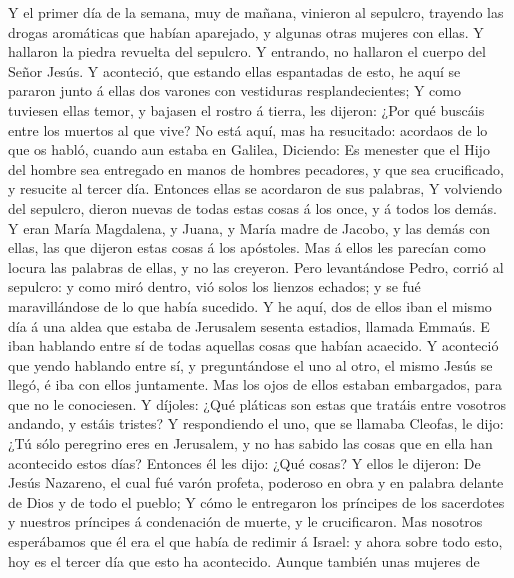  Y el primer día de la semana, muy de mañana, vinieron al
sepulcro, trayendo las drogas aromáticas que habían aparejado, y algunas
otras mujeres con ellas.  Y hallaron la piedra revuelta
del sepulcro.  Y entrando, no hallaron el cuerpo del Señor
Jesús.  Y aconteció, que estando ellas espantadas de esto,
he aquí se pararon junto á ellas dos varones con vestiduras
resplandecientes;  Y como tuviesen ellas temor, y bajasen
el rostro á tierra, les dijeron: ¿Por qué buscáis entre los muertos al
que vive?  No está aquí, mas ha resucitado: acordaos de lo
que os habló, cuando aun estaba en Galilea,  Diciendo: Es
menester que el Hijo del hombre sea entregado en manos de hombres
pecadores, y que sea crucificado, y resucite al tercer día.
 Entonces ellas se acordaron de sus palabras,
 Y volviendo del sepulcro, dieron nuevas de todas estas
cosas á los once, y á todos los demás.  Y eran María
Magdalena, y Juana, y María madre de Jacobo, y las demás con ellas, las
que dijeron estas cosas á los apóstoles.  Mas á ellos les
parecían como locura las palabras de ellas, y no las creyeron.
 Pero levantándose Pedro, corrió al sepulcro: y como miró
dentro, vió solos los lienzos echados; y se fué maravillándose de lo que
había sucedido.  Y he aquí, dos de ellos iban el mismo
día á una aldea que estaba de Jerusalem sesenta estadios, llamada
Emmaús.  E iban hablando entre sí de todas aquellas cosas
que habían acaecido.  Y aconteció que yendo hablando
entre sí, y preguntándose el uno al otro, el mismo Jesús se llegó, é iba
con ellos juntamente.  Mas los ojos de ellos estaban
embargados, para que no le conociesen.  Y díjoles: ¿Qué
pláticas son estas que tratáis entre vosotros andando, y estáis tristes?
 Y respondiendo el uno, que se llamaba Cleofas, le dijo:
¿Tú sólo peregrino eres en Jerusalem, y no has sabido las cosas que en
ella han acontecido estos días?  Entonces él les dijo:
¿Qué cosas? Y ellos le dijeron: De Jesús Nazareno, el cual fué varón
profeta, poderoso en obra y en palabra delante de Dios y de todo el
pueblo;  Y cómo le entregaron los príncipes de los
sacerdotes y nuestros príncipes á condenación de muerte, y le
crucificaron.  Mas nosotros esperábamos que él era el que
había de redimir á Israel: y ahora sobre todo esto, hoy es el tercer día
que esto ha acontecido.  Aunque también unas mujeres de
